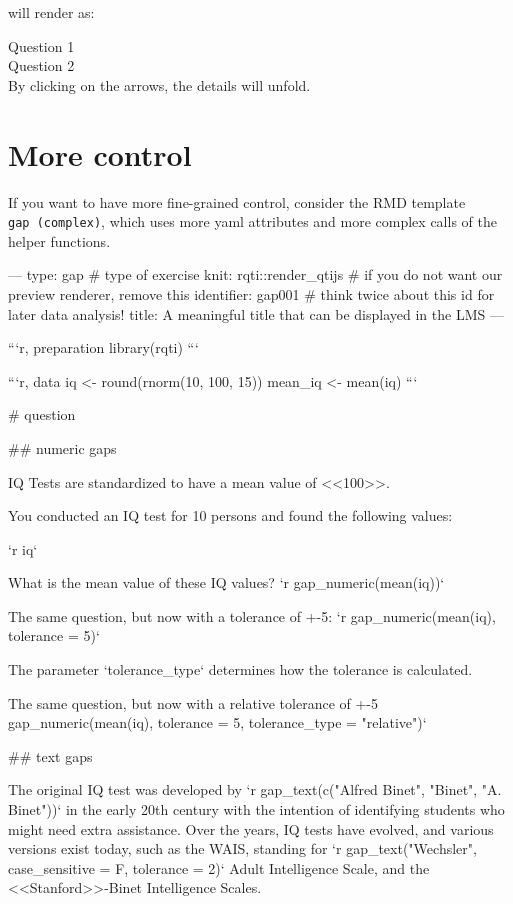 \documentclass[twoside]{tufte-book}
\newenvironment{Shaded}{}{}
\begin{document}
will render as:

\noindent\textrightarrow{} Question 1\\
\noindent\textrightarrow{} Question 2\\

By clicking on the arrows, the details will unfold.

\section{More control}\label{more-control-2}

If you want to have more fine-grained control, consider the RMD template \texttt{gap\ (complex)}, which uses more yaml attributes and more complex calls of the helper functions.

\begin{Shaded}
\begin{Highlighting}
---
type: gap # type of exercise
knit: rqti::render_qtijs # if you do not want our preview renderer, remove this
identifier: gap001 # think twice about this id for later data analysis!
title: A meaningful title that can be displayed in the LMS
---

```{r, preparation}
library(rqti)
```

```{r, data}
iq <- round(rnorm(10, 100, 15))
mean_iq <- mean(iq)
```

# question

## numeric gaps

IQ Tests are standardized to have a mean value of <<100>>.

You conducted an IQ test for 10 persons and found the following values: 

`r iq`

What is the mean value of these IQ values? `r gap_numeric(mean(iq))`

The same question, but now with a tolerance of +-5: `r gap_numeric(mean(iq),
tolerance = 5)`

The parameter `tolerance_type` determines how the tolerance is calculated.

The same question, but now with a relative tolerance of +-5%: `r
gap_numeric(mean(iq), tolerance = 5, tolerance_type = "relative")`

## text gaps

The original IQ test was developed by `r gap_text(c("Alfred Binet", "Binet", "A.
Binet"))` in the early 20th century with the intention of identifying students
who might need extra assistance. Over the years, IQ tests have evolved, and
various versions exist today, such as the WAIS, standing for `r
gap_text("Wechsler", case_sensitive = F, tolerance = 2)` Adult Intelligence
Scale, and the <<Stanford>>-Binet Intelligence Scales.


\end{Highlighting}
\end{Shaded}
\end{document}
